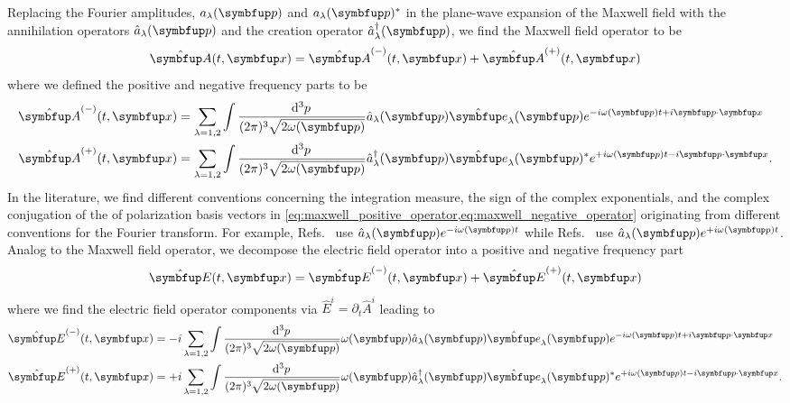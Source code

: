 Replacing the Fourier amplitudes, $a_\lambda(\vb{p})$ and $a_\lambda(\vb{p})^*$ in the plane-wave expansion of the Maxwell field with the annihilation operators $\hat{a}_\lambda(\vb{p})$ and the creation operator $\hat{a}_\lambda^\dagger(\vb{p})$, we find the Maxwell field operator to be
\begin{equation}
	\vu{A}(t,\vb{x})
	=
	\vu{A}^{(-)}(t,\vb{x})
	+
	\vu{A}^{(+)}(t,\vb{x})
	\label{eq:maxwell_operator}
\end{equation}
where we defined the positive and negative frequency parts to be
\begin{align}
	\vu{A}^{(-)}(t,\vb{x})
	&=
	\sum_{\lambda=1,2}
	\int\frac{\dd[3]{p}}{(2\pi)^3\sqrt{2\omega(\vb{p})}}
	\hat{a}_\lambda(\vb{p})
	\vu{e}_\lambda(\vb{p})
	e^{-i\omega(\vb{p})t+i\vb{p}\vdot\vb{x}}
	\label{eq:maxwell_negative_operator}
	\\
	\vu{A}^{(+)}(t,\vb{x})
	&=
	\sum_{\lambda=1,2}
	\int\frac{\dd[3]{p}}{(2\pi)^3\sqrt{2\omega(\vb{p})}}
	\hat{a}_\lambda^\dagger(\vb{p})
	\vu{e}_\lambda(\vb{p})^*
	e^{+i\omega(\vb{p})t-i\vb{p}\vdot\vb{x}}
	\label{eq:maxwell_positive_operator}
	.
\end{align}
In the literature, we find different conventions concerning the integration measure, the sign of the complex exponentials, and the complex conjugation of the of polarization basis vectors in \cref{eq:maxwell_positive_operator,eq:maxwell_negative_operator} originating from different conventions for the Fourier transform.
For example, Refs.~\cite{Peskin1995,Greiner2013} use $\hat{a}_\lambda(\vb{p})e^{-i\omega(\vb{p})t}$ while Refs.~\cite{Srednicki2007,Weinberg1995} use $\hat{a}_\lambda(\vb{p})e^{+i\omega(\vb{p})t}$.
Analog to the Maxwell field operator, we decompose the electric field operator into a positive and negative frequency part
\begin{equation}
	\vu{E}(t,\vb{x})
	=
	\vu{E}^{(-)}(t,\vb{x})
	+
	\vu{E}^{(+)}(t,\vb{x})
	\label{eq:electric_operator}
\end{equation}
where we find the electric field operator components via $\hat{E}^i=\partial_t\hat{A}^i$ leading to
\begin{align}
	\vu{E}^{(-)}(t,\vb{x})
	&=
	-i
	\sum_{\lambda=1,2}
	\int\frac{\dd[3]{p}}{(2\pi)^3\sqrt{2\omega(\vb{p})}}
	\omega(\vb{p})
	\hat{a}_\lambda(\vb{p})
	\vu{e}_\lambda(\vb{p})
	e^{-i\omega(\vb{p})t+i\vb{p}\vdot\vb{x}}
	\label{eq:electric_negative_operator}
	\\
	\vu{E}^{(+)}(t,\vb{x})
	&=
	+i
	\sum_{\lambda=1,2}
	\int\frac{\dd[3]{p}}{(2\pi)^3\sqrt{2\omega(\vb{p})}}
	\omega(\vb{p})
	\hat{a}_\lambda^\dagger(\vb{p})
	\vu{e}_\lambda(\vb{p})^*
	e^{+i\omega(\vb{p})t-i\vb{p}\vdot\vb{x}}
	\label{eq:electric_positive_operator}
	.
\end{align}
